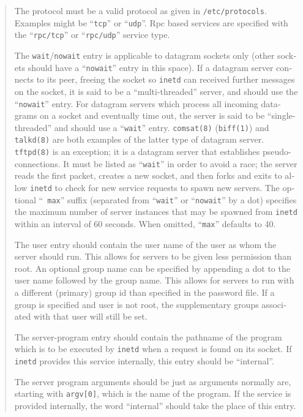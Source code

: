 \begin{appendix}
\begin{english}
\begin{quote}
	The protocol must be a valid protocol as given in {\tt /etc/protocols}.
	Examples might be ``{\tt tcp}'' or ``{\tt udp}''. Rpc based services are
	specified with the ``{\tt rpc/tcp}'' or ``{\tt rpc/udp}'' service type.

	The {\tt wait}/{\tt nowait} entry is applicable to datagram sockets
	only (other sockets should have a ``{\tt nowait}'' entry in this
	space). If a datagram server connects to its peer, freeing the
	socket so {\tt inetd} can received further messages on the socket,
	it is said to be a ``multi-threaded'' server, and should use the
	``{\tt nowait}'' entry. For datagram servers which process all
	incoming datagrams on a socket and eventually time out, the server
	is said to be ``single-threaded'' and should use a ``{\tt wait}''
	entry. {\tt comsat(8)} ({\tt biff(1)}) and {\tt talkd(8)} are both
	examples of the latter type of datagram server. {\tt tftpd(8)} is
	an exception; it is a datagram server that establishes
	pseudo-connections. It must be listed as ``{\tt wait}'' in order to
	avoid a race; the server reads the first packet, creates a new
	socket, and then forks and exits to allow {\tt inetd} to check for
	new service requests to spawn new servers. The optional ``{\tt
	max}'' suffix (separated from ``{\tt wait}'' or ``{\tt nowait}'' by
	a dot) specifies the maximum number of server instances that may be
	spawned from {\tt inetd} within an interval of 60 seconds. When
	omitted, ``{\tt max}'' defaults to 40.

	The user entry should contain the user name of the user as whom the
	server should run. This allows for servers to be given less
	permission than root. An optional group name can be specified by
	appending a dot to the user name followed by the group name. This
	allows for servers to run with a different (primary) group id than
	specified in the password file. If a group is specified and user is
	not root, the supplementary groups associated with that user will
	still be set.

	The server-program entry should contain the pathname of the program
	which is to be executed by {\tt inetd} when a request is found on
	its socket. If {\tt inetd} provides this service internally, this entry
	should be ``internal''.

	The server program arguments should be just as arguments normally
	are, starting with {\tt argv[0]}, which is the name of the program. 
	If the service is provided internally, the word ``internal'' should
	take the place of this entry.


\end{quote}
\end{english}
\end{appendix}
